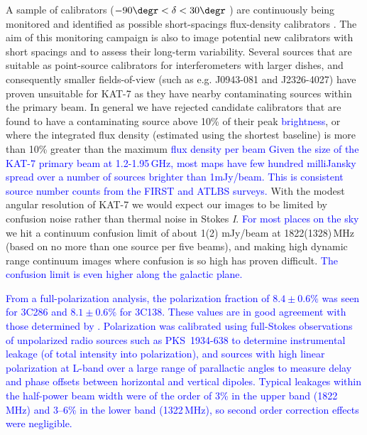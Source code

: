 \noindent
A sample of calibrators ($-90\degr<\delta<30\degr$ ) are continuously
being monitored and identified as possible short-spacings flux-density
calibrators \citep{kassaye}. The aim of this monitoring campaign is
also to image potential new calibrators with short spacings and to
assess their long-term variability. Several sources that are suitable
as point-source calibrators for interferometers with larger dishes,
and consequently smaller fields-of-view (such as e.g. \mbox{J0943-081}
and \mbox{J2326-4027}) have proven unsuitable for KAT-7 as they have
nearby contaminating sources within the primary beam.
In general we have rejected candidate calibrators that are found to
have a contaminating source above 10\% of their peak
\textcolor{blue}{brightness}, or where the integrated flux density
(estimated using the shortest baseline) is more than 10\% greater than
the maximum \textcolor{blue}{flux density per beam}
%
\textcolor{blue}{Given the size of the KAT-7 primary beam at
  1.2-1.95\,GHz, most maps have few hundred milliJansky spread over a
  number of sources brighter than 1mJy/beam. This is consistent source
  number counts from the FIRST and ATLBS surveys.}  With the modest
angular resolution of KAT-7 we would expect our images to be limited
by confusion noise rather than thermal noise in Stokes
\emph{I}. \textcolor{blue}{For most places on the sky} we hit a
continuum confusion limit of about 1(2) mJy/beam at 1822(1328)\,MHz
(based on no more than one source per five beams), and making high
dynamic range continuum images where confusion is so high has proven
difficult. \textcolor{blue}{The confusion limit is even higher along
  the galactic plane.}

\textcolor{blue}{ From a full-polarization analysis, the polarization
  fraction of $8.4\pm0.6 \%$ was seen for 3C286 and $8.1\pm0.6 \%$ for
  3C138. These values are in good agreement with those determined by
  \citet{perley}.  Polarization was calibrated using full-Stokes
  observations of unpolarized radio sources such as \mbox{PKS
    1934-638} to determine instrumental leakage (of total intensity
  into polarization), and sources with high linear polarization at
  L-band over a large range of parallactic angles to measure delay and
  phase offsets between horizontal and vertical dipoles.  Typical
  leakages within the half-power beam width were of the order of 3\%
  in the upper band (1822\,MHz) and 3--6\% in the lower band
  (1322\,MHz), so second order correction effects were negligible.}

